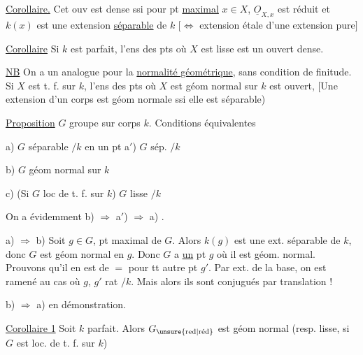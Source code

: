 
\uline{Corollaire.} Cet ouv est dense ssi pour  pt \uline{maximal} $x\in X$, $\underline O_{X,x}$ est réduit et $k(x)$ est une extension \uline{séparable} de $k$ $[\Leftrightarrow$  extension étale d'une extension  pure$]$

\uline{Corollaire} Si $k$ est parfait, l'ens des pts où $X$ est lisse est un ouvert dense.

\uline{NB} On a un  analogue pour la \uline{normalité géométrique}, sans condition de finitude. Si $X$ est   t. f. sur $k$, l'ens des pts où $X$ est géom normal sur $k$ est ouvert,  [Une extension d'un corps est géom normale ssi elle est séparable)


\uline{Proposition} $G$ groupe sur corps $k$. Conditions équivalentes


a) $G$  séparable $/k$ en un pt \qquad a$'$) $G$ sép. $/k$ 

b) $G$ géom normal sur $k$

c) (Si $G$ loc de t. f. sur $k$) $G$ lisse $/k$

On a évidemment  b) $\Rightarrow$ a$'$) $\Longrightarrow$ a) .


a) $\Rightarrow$ b) \qquad Soit $g\in G$,  pt maximal de $G$.   Alors $k(g)$ est une ext. séparable de $k$, donc $G$ est géom normal en $g$.   Donc $G$ a \uline{un} pt $g$ où il est géom. normal. Prouvons qu'il en est de $=$ pour tt autre pt $g'$. Par ext. de la base, on est ramené au cas où $g$, $g'$ rat $/k$. Mais alors ils sont conjugués par translation !

b) $\Rightarrow$ a) \qquad {} en démonstration.

\uline{Corollaire 1} Soit $k$ parfait. Alors $G_{\text{\unsure{red|réd}}}$ est géom normal  (resp. lisse, si $G$ est loc. de t. f. sur $k$)


